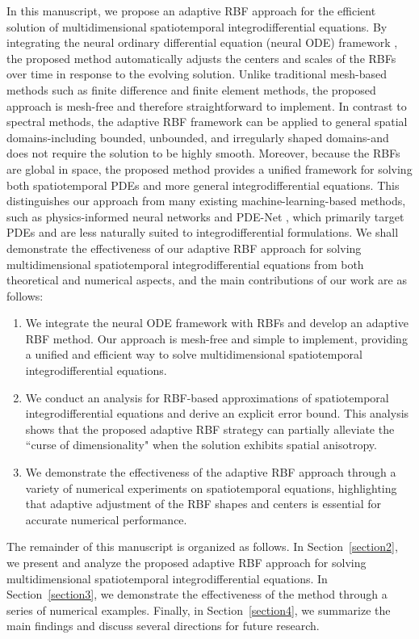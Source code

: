 In this manuscript, we propose an adaptive RBF approach for the efficient solution of multidimensional spatiotemporal integrodifferential equations. By integrating the neural ordinary differential equation (neural ODE) framework \cite{chen2018neural}, the proposed method automatically adjusts the centers and scales of the RBFs over time in response to the evolving solution. Unlike traditional mesh-based methods such as finite difference and finite element methods, the proposed approach is mesh-free and therefore straightforward to implement. In contrast to spectral methods, the adaptive RBF framework can be applied to general spatial domains-including bounded, unbounded, and irregularly shaped domains-and does not require the solution to be highly smooth. Moreover, because the RBFs are global in space, the proposed method provides a unified framework for solving both spatiotemporal PDEs and more general integrodifferential equations. This distinguishes our approach from many existing machine-learning-based methods, such as physics-informed neural networks \cite{raissi2019physics,cuomo2022scientific} and PDE-Net \cite{long2018pde}, which primarily target PDEs and are less naturally suited to integrodifferential formulations.
We shall demonstrate the effectiveness of our adaptive RBF approach for solving multidimensional spatiotemporal integrodifferential equations from both theoretical and numerical aspects, and the main contributions of our work are as follows:
\begin{enumerate}
\item We integrate the neural ODE framework with RBFs and develop an adaptive RBF method. Our approach is mesh-free and simple to implement, providing a unified and efficient way to solve multidimensional spatiotemporal integrodifferential equations.
\item We conduct an analysis for RBF-based approximations of spatiotemporal integrodifferential equations and derive an explicit error bound. This analysis shows that the proposed adaptive RBF strategy can partially alleviate the ``curse of dimensionality" when the solution exhibits spatial anisotropy.
\item We demonstrate the effectiveness of the adaptive RBF approach through a variety of numerical experiments on spatiotemporal equations, highlighting that adaptive adjustment of the RBF shapes and centers is essential for accurate numerical performance.
\end{enumerate}

The remainder of this manuscript is organized as follows. In Section~\ref{section2}, we present and analyze the proposed adaptive RBF approach for solving multidimensional spatiotemporal integrodifferential equations. In Section~\ref{section3}, we demonstrate the effectiveness of the method through a series of numerical examples. Finally, in Section~\ref{section4}, we summarize the main findings and discuss several directions for future research.

